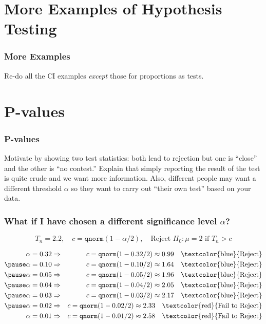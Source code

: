 
\section{More Examples of Hypothesis Testing}
\begin{frame}
  \frametitle{More Examples}
  Re-do all the CI examples \emph{except} those for proportions as tests. 
\end{frame}
\section{P-values}
\begin{frame}
  \frametitle{P-values}
  Motivate by showing two test statistics: both lead to rejection but one is ``close'' and the other is ``no contest.''
  Explain that simply reporting the result of the test is quite crude and we want more information.
  Also, different people may want a different threshold $\alpha$ so they want to carry out ``their own test'' based on your data.
\end{frame}
\begin{frame}
  \frametitle{What if I have chosen a different significance level $\alpha$?}

  \vspace{-2em}

  \[\boxed{T_n = 2.2, \quad c = \texttt{qnorm}(1 -\alpha/2), \quad \mbox{Reject } H_0\colon \mu = 2 \mbox{ if } T_n > c}\]

  \vspace{-2em}

  \pause

  \begin{eqnarray*}
    \alpha = 0.32 &\Rightarrow& c = \texttt{qnorm}(1 - 0.32/2) \approx 0.99 \quad \mbox{\textcolor{blue}{Reject}}\\ \pause
    \alpha = 0.10 &\Rightarrow& c = \texttt{qnorm}(1 - 0.10/2) \approx 1.64\quad \mbox{\textcolor{blue}{Reject}}\\  \pause
    \alpha = 0.05 &\Rightarrow& c = \texttt{qnorm}(1 - 0.05/2) \approx 1.96 \quad \mbox{\textcolor{blue}{Reject}}\\ \pause
    \alpha = 0.04 &\Rightarrow& c = \texttt{qnorm}(1 - 0.04/2) \approx 2.05\quad \mbox{\textcolor{blue}{Reject}}\\  \pause
    \alpha = 0.03 &\Rightarrow& c = \texttt{qnorm}(1 - 0.03/2) \approx 2.17\quad \mbox{\textcolor{blue}{Reject}}\\  \pause
    \alpha = 0.02 &\Rightarrow& c = \texttt{qnorm}(1 - 0.02/2) \approx 2.33 \quad \mbox{\textcolor{red}{Fail to Reject}}\\
    \alpha = 0.01 &\Rightarrow& c = \texttt{qnorm}(1 - 0.01/2) \approx 2.58 \quad \mbox{\textcolor{red}{Fail to Reject}}
  \end{eqnarray*}

  
\end{frame}
